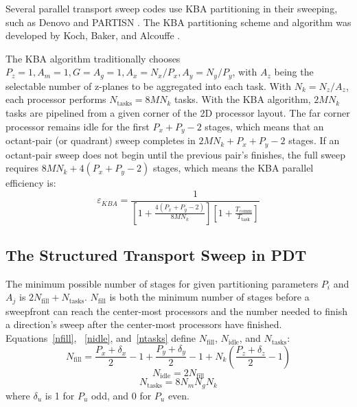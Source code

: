 \documentclass{anstrans}
\begin{document}
Several parallel transport sweep codes use KBA partitioning in their sweeping, such as Denovo \cite{denovo} and PARTISN \cite{partisn}. The KBA partitioning scheme and algorithm was developed by Koch, Baker, and Alcouffe \cite{partisn}.

The KBA algorithm traditionally chooses $P_z = 1, A_m = 1, G = A_g = 1, A_x = N_x/P_x, A_y = N_y/P_y$, with $A_z$ being the selectable number of z-planes to be aggregated into each task. With $N_k = N_z/A_z$, each processor performs $N_{\text{tasks}} = 8MN_k$ tasks. With the KBA algorithm, $2MN_k$ tasks are pipelined from a given corner of the 2D processor layout. The far corner processor remains idle for the first $P_x + P_y - 2 $ stages, which means that an octant-pair (or quadrant) sweep completes in $2MN_k + P_x + P_y - 2$ stages. If an octant-pair sweep does not begin until the previous pair's finishes, the full sweep requires $8MN_k + 4(P_x+P_y-2)$ stages, which means the KBA parallel efficiency is:
\begin{equation}
\varepsilon_{KBA} = \frac{1}{[1+\frac{4(P_x+P_y-2)}{8MN_k}][1+\frac{T_{\text{comm}}}{T_{\text{task}}}]}
\label{eKBA}
\end{equation}

\subsection{The Structured Transport Sweep in PDT}
The minimum possible number of stages for given partitioning parameters $P_i$ and $A_j$ is $2 N_{\text{fill}}+N_{\text{tasks}}$. $N_{\text{fill}}$ is both the minimum number of stages before a sweepfront can reach the center-most processors and the number needed to finish a direction's sweep after the center-most processors have finished. Equations~\eqref{nfill}, ~\eqref{nidle}, and~\eqref{ntasks} define $N_{\text{fill}}$, $N_{\text{idle}}$, and $N_{\text{tasks}}$:
\begin{equation}
N_{\text{fill}} = \frac{P_x + \delta_x}{2} - 1 + \frac{P_y + \delta_y}{2} - 1 + N_k (\frac{P_z + \delta_z}{2} - 1)
\label{nfill}
\end{equation}
\begin{equation}
N_{\text{idle}} = 2 N_{\text{fill}}
\label{nidle}
\end{equation}
\begin{equation}
N_{\text{tasks}} = 8 N_m N_g N_k
\label{ntasks}
\end{equation}
where $\delta_u$ is 1 for $P_u$ odd, and 0 for $P_u$ even.
\end{document}
